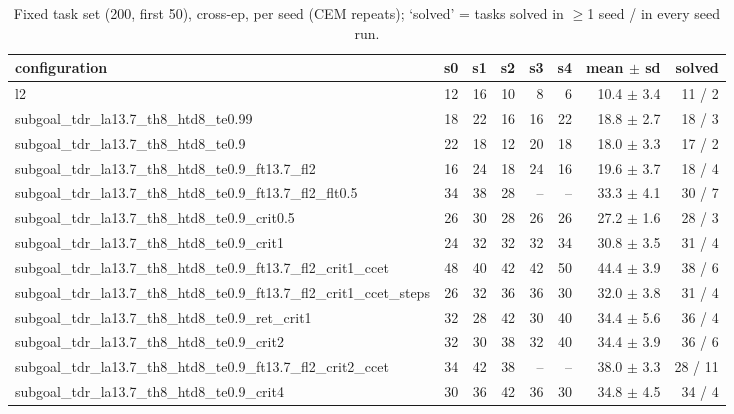 \begin{table}[H]
\centering\small
\caption{Fixed task set (200, first 50), cross-ep, per seed (CEM repeats); `solved' = tasks solved in $\ge$1 seed / in every seed run.}
\label{tab:gas-mpc-pooled-cross-task200-n50}
\begin{tabular}{lrrrrrrr}
\toprule
configuration & s0 & s1 & s2 & s3 & s4 & mean $\pm$ sd & solved \\
\midrule
l2 & 12 & 16 & 10 & 8 & 6 & 10.4 $\pm$ 3.4 & 11 / 2 \\
subgoal\_tdr\_la13.7\_th8\_htd8\_te0.99 & 18 & 22 & 16 & 16 & 22 & 18.8 $\pm$ 2.7 & 18 / 3 \\
subgoal\_tdr\_la13.7\_th8\_htd8\_te0.9 & 22 & 18 & 12 & 20 & 18 & 18.0 $\pm$ 3.3 & 17 / 2 \\
subgoal\_tdr\_la13.7\_th8\_htd8\_te0.9\_ft13.7\_fl2 & 16 & 24 & 18 & 24 & 16 & 19.6 $\pm$ 3.7 & 18 / 4 \\
subgoal\_tdr\_la13.7\_th8\_htd8\_te0.9\_ft13.7\_fl2\_flt0.5 & 34 & 38 & 28 & -- & -- & 33.3 $\pm$ 4.1 & 30 / 7 \\
subgoal\_tdr\_la13.7\_th8\_htd8\_te0.9\_crit0.5 & 26 & 30 & 28 & 26 & 26 & 27.2 $\pm$ 1.6 & 28 / 3 \\
subgoal\_tdr\_la13.7\_th8\_htd8\_te0.9\_crit1 & 24 & 32 & 32 & 32 & 34 & 30.8 $\pm$ 3.5 & 31 / 4 \\
subgoal\_tdr\_la13.7\_th8\_htd8\_te0.9\_ft13.7\_fl2\_crit1\_ccet & 48 & 40 & 42 & 42 & 50 & 44.4 $\pm$ 3.9 & 38 / 6 \\
subgoal\_tdr\_la13.7\_th8\_htd8\_te0.9\_ft13.7\_fl2\_crit1\_ccet\_steps & 26 & 32 & 36 & 36 & 30 & 32.0 $\pm$ 3.8 & 31 / 4 \\
subgoal\_tdr\_la13.7\_th8\_htd8\_te0.9\_ret\_crit1 & 32 & 28 & 42 & 30 & 40 & 34.4 $\pm$ 5.6 & 36 / 4 \\
subgoal\_tdr\_la13.7\_th8\_htd8\_te0.9\_crit2 & 32 & 30 & 38 & 32 & 40 & 34.4 $\pm$ 3.9 & 36 / 6 \\
subgoal\_tdr\_la13.7\_th8\_htd8\_te0.9\_ft13.7\_fl2\_crit2\_ccet & 34 & 42 & 38 & -- & -- & 38.0 $\pm$ 3.3 & 28 / 11 \\
subgoal\_tdr\_la13.7\_th8\_htd8\_te0.9\_crit4 & 30 & 36 & 42 & 36 & 30 & 34.8 $\pm$ 4.5 & 34 / 4 \\
\bottomrule
\end{tabular}
\end{table}
